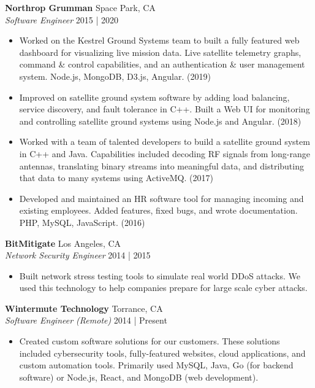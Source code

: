 \documentclass[a4paper]{article}
\begin{document}
\textbf{Northrop Grumman} \hfill Space Park, CA\\
\textit{Software Engineer} \hfill 2015 | 2020\\
\vspace{-1mm}
\begin{itemize} \itemsep 1pt
	\item Worked on the Kestrel Ground Systems team to built a fully featured web dashboard for visualizing live mission data. Live satellite telemetry graphs, command \& control capabilities, and an authentication \& user management system. Node.js, MongoDB, D3.js, Angular. (2019)
	\item Improved on satellite ground system software by adding load balancing, service discovery, and fault tolerance in C++. Built a Web UI for monitoring and controlling satellite ground systems using Node.js and Angular. (2018)
	\item Worked with a team of talented developers to build a satellite ground system in C++ and Java. Capabilities included decoding RF signals from long-range antennas, translating binary streams into meaningful data, and distributing that data to many systems using ActiveMQ. (2017)
	\item Developed and maintained an HR software tool for managing incoming and existing employees. Added features, fixed bugs, and wrote documentation. PHP, MySQL, JavaScript. (2016)
\end{itemize}
\textbf{BitMitigate} \hfill Los Angeles, CA\\
\textit{Network Security Engineer} \hfill 2014 | 2015\\
\vspace{-1mm}
\begin{itemize} \itemsep 1pt
	\item Built network stress testing tools to simulate real world DDoS attacks. We used this technology to help companies prepare for large scale cyber attacks.
\end{itemize}
\textbf{Wintermute Technology} \hfill Torrance, CA\\
\textit{Software Engineer (Remote)} \hfill 2014 | Present\\
\vspace{-1mm}
\begin{itemize} \itemsep 1pt
	\item Created custom software solutions for our customers. These solutions included cybersecurity tools, fully-featured websites, cloud applications, and custom automation tools. Primarily used MySQL, Java, Go (for backend software) or Node.js, React, and MongoDB (web development).
\end{itemize}
\end{document}
